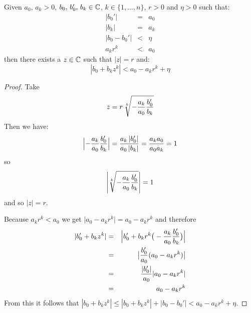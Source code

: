 \begin{lemma}\label{lemma:est3}
Given $a_0,\,a_k > 0$, $b_0,\,b_0',\,b_k\in\mathbb{C}$, $k\in\{1,\ldots,n\}$, $r > 0$ and $\eta > 0$
such that:
\begin{eqnarray*}
|b_0'| &=& a_0 \\
|b_k| &=& a_k \\
|b_0 - b_0'| &<& \eta\\
a_k r^k &<& a_0
\end{eqnarray*}
then there exists a $z\in\mathbb{C}$ such that $|z| = r$ and:
$$\left|b_0 + b_k z^k\right| < a_0 - a_k r^k + \eta$$
\end{lemma}
\begin{proof}
Take
$$z = r\,\root k\of{-{a_k\over a_0}{b_0'\over b_k}}$$
Then we have:
$$\Big|{-{a_k\over a_0}{b_0'\over b_k}}\Big| = {a_k\left|b_0'\right|\over a_0\left|b_k\right|}
= {a_k a_0\over a_0 a_k} = 1$$
so
$$\Bigg|\root k\of{-{a_k\over a_0}{b_0'\over b_k}}\Bigg| = 1$$
and so $|z| = r$.

Because $a_k r^k < a_0$ we get $\big|a_0 - a_k r^k\big| = a_0 - a_k r^k$ and therefore
\begin{eqnarray*}
|b_0' + b_k z^k| &=& \Big|b_0' + b_k r^k \big(-{a_k\over a_0}{b_0'\over b_k}\big)\Big|\\
&=& \big|{b_0'\over a_0}(a_0 - a_k r^k)\big|\\
&=& {|b_0'|\over a_0}|a_0 - a_k r^k|\\
&=& a_0 - a_k r^k
\end{eqnarray*}
From this it follows that
$\left|b_0 + b_k z^k\right| \le \left|b_0 + b_k z^k\right| + |b_0 - b_0'| < a_0 - a_k r^k + \eta$.
\end{proof}

